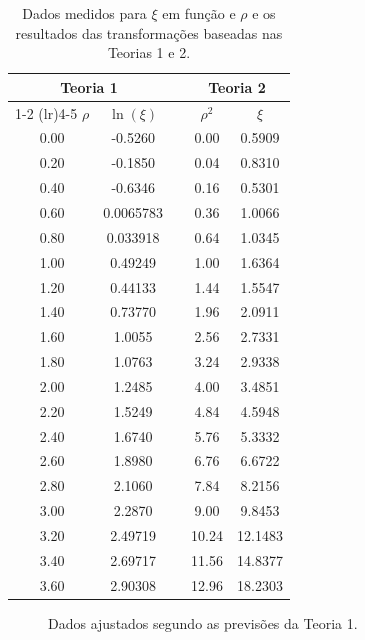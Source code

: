 \begin{table}\forcerectofloat
\centering
\begin{tabular}{ccccc}
\toprule
\multicolumn{2}{c}{Teoria 1} && \multicolumn{2}{c}{Teoria 2} \\
\cmidrule(lr){1-2} \cmidrule(lr){4-5}
$\rho$  & $\ln(\xi)$    && $\rho^2$   & $\xi$ \\
\midrule
0.00    & -0.5260      &&   0.00     & 0.5909  \\ 
0.20    & -0.1850      &&   0.04     & 0.8310  \\
0.40    & -0.6346      &&   0.16     & 0.5301  \\
0.60    & 0.0065783    &&   0.36     & 1.0066  \\
0.80    & 0.033918     &&   0.64     & 1.0345  \\
1.00    & 0.49249      &&   1.00     & 1.6364  \\
1.20    & 0.44133      &&   1.44     & 1.5547  \\
1.40    & 0.73770      &&   1.96     & 2.0911  \\
1.60    & 1.0055       &&   2.56     & 2.7331  \\
1.80    & 1.0763       &&   3.24     & 2.9338  \\
2.00    & 1.2485       &&   4.00     & 3.4851  \\
2.20    & 1.5249       &&   4.84     & 4.5948  \\
2.40    & 1.6740       &&   5.76     & 5.3332  \\
2.60    & 1.8980       &&   6.76     & 6.6722  \\
2.80    & 2.1060       &&   7.84     & 8.2156  \\
3.00    & 2.2870       &&   9.00     & 9.8453  \\
3.20    & 2.49719      &&   10.24    & 12.1483 \\
3.40    & 2.69717      &&   11.56    & 14.8377 \\
3.60    & 2.90308      &&   12.96    & 18.2303 \\
\bottomrule
\end{tabular}
\vspace{1mm}
\caption{Dados medidos para $\xi$ em função e $\rho$ e os resultados das transformações baseadas nas Teorias 1 e 2. \label{TabelaMedidas}}
\end{table}


\begin{figure}\forcerectofloat
\centering

\caption{Dados ajustados segundo as previsões da Teoria 1.\label{GraficoTeoria1}}
\end{figure}

